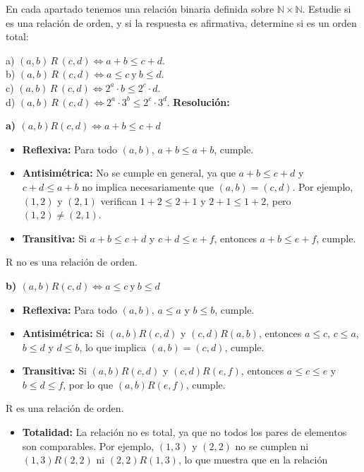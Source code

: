 \documentclass[a4paper,12pt]{article}
\begin{document}
\begin{ejercicio}[title=Ejercicio 16]
En cada apartado tenemos una relación binaria definida sobre $\mathbb{N}\times\mathbb{N}$. Estudie si es una relación
de orden, y si la respuesta es afirmativa, determine si es un orden total:

a) $(a,b)\,R\,(c,d) \iff a+b \le c+d$.\\
b) $(a,b)\,R\,(c,d) \iff a \le c \ \text{y}\ b \le d$.\\
c) $(a,b)\,R\,(c,d) \iff 2^a\cdot b \le 2^c\cdot d$.\\
d) $(a,b)\,R\,(c,d) \iff 2^a\cdot 3^b \le 2^c\cdot 3^d$.
\tcblower
\textbf{Resolución:}

\textbf{a) $(a,b)R(c,d) \iff a+b \le c+d$}

\begin{itemize}
\item \textbf{Reflexiva:} Para todo $(a,b)$, $a+b \le a+b$, cumple.
\item \textbf{Antisimétrica:} No se cumple en general, ya que $a+b \le c+d$ y $c+d \le a+b$ no implica necesariamente que $(a,b) = (c,d)$. Por ejemplo, $(1,2)$ y $(2,1)$ verifican $1+2 \le 2+1$ y $2+1 \le 1+2$, pero $(1,2) \neq (2,1)$.
\item \textbf{Transitiva:} Si $a+b \le c+d$ y $c+d \le e+f$, entonces $a+b \le e+f$, cumple.
\end{itemize}

\(\boxed{\text{R no es una relación de orden.}}\)

\vspace{0.5em}

\textbf{b) $(a,b)R(c,d) \iff a \le c \ \text{y}\ b \le d$}

\begin{itemize}
\item \textbf{Reflexiva:} Para todo $(a,b)$, $a \le a$ y $b \le b$, cumple.
\item \textbf{Antisimétrica:} Si $(a,b)R(c,d)$ y $(c,d)R(a,b)$, entonces $a \le c$, $c \le a$, $b \le d$ y $d \le b$, lo que implica $(a,b) = (c,d)$, cumple.
\item \textbf{Transitiva:} Si $(a,b)R(c,d)$ y $(c,d)R(e,f)$, entonces $a \le c \le e$ y $b \le d \le f$, por lo que $(a,b)R(e,f)$, cumple.
\end{itemize}

\(\boxed{\text{R es una relación de orden.}}\)

\begin{itemize}
\item \textbf{Totalidad:} La relación no es total, ya que no todos los pares de elementos son comparables. Por ejemplo, $(1,3)$ y $(2,2)$ no se cumplen ni $(1,3)R(2,2)$ ni $(2,2)R(1,3)$, lo que muestra que en la relación 
\end{itemize}


\end{ejercicio}
\end{document}
